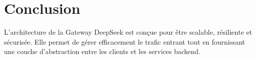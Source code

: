\documentclass[12pt,a4paper]{article}
\begin{document}
\section{Conclusion}
\label{sec:conclusion}

L'architecture de la Gateway DeepSeek est conçue pour être scalable, résiliente et sécurisée. Elle permet de gérer efficacement le trafic entrant tout en fournissant une couche d'abstraction entre les clients et les services backend.
\end{document}
